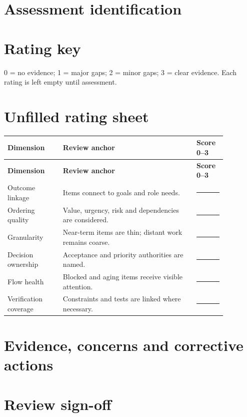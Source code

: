 \documentclass[11pt,letterpaper]{article}
\begin{document}
\section{Assessment identification}
\section{Rating key}
0 = no evidence; 1 = major gaps; 2 = minor gaps; 3 = clear evidence. Each rating is left empty until assessment.

\section{Unfilled rating sheet}
\begin{longtable}{|p{0.22\linewidth}|p{0.53\linewidth}|p{0.12\linewidth}|}\hline
\textbf{Dimension} & \textbf{Review anchor} & \textbf{Score 0--3} \\ \hline\endfirsthead
\textbf{Dimension} & \textbf{Review anchor} & \textbf{Score 0--3} \\ \hline\endhead
Outcome linkage & Items connect to goals and role needs. & \rule{0.4in}{0.35pt} \\ \hline
Ordering quality & Value, urgency, risk and dependencies are considered. & \rule{0.4in}{0.35pt} \\ \hline
Granularity & Near-term items are thin; distant work remains coarse. & \rule{0.4in}{0.35pt} \\ \hline
Decision ownership & Acceptance and priority authorities are named. & \rule{0.4in}{0.35pt} \\ \hline
Flow health & Blocked and aging items receive visible attention. & \rule{0.4in}{0.35pt} \\ \hline
Verification coverage & Constraints and tests are linked where necessary. & \rule{0.4in}{0.35pt} \\ \hline
\end{longtable}
\section{Evidence, concerns and corrective actions}
\section{Review sign-off}
\end{document}
